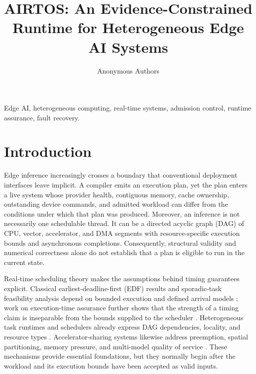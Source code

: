 \documentclass[lettersize,journal]{IEEEtran}
\begin{document}
\title{AIRTOS: An Evidence-Constrained Runtime for Heterogeneous Edge AI Systems}

\author{Anonymous Authors}

\maketitle

\begin{abstract}
\end{abstract}

\begin{IEEEkeywords}
Edge AI, heterogeneous computing, real-time systems, admission control, runtime assurance, fault recovery.
\end{IEEEkeywords}

\section{Introduction}
Edge inference increasingly crosses a boundary that conventional deployment
interfaces leave implicit. A compiler emits an execution plan, yet the plan
enters a live system whose provider health, contiguous memory, cache ownership,
outstanding device commands, and admitted workload can differ from the
conditions under which that plan was produced. Moreover, an inference is not
necessarily one schedulable thread. It can be a directed acyclic graph (DAG) of
CPU, vector, accelerator, and DMA segments with resource-specific execution
bounds and asynchronous completions. Consequently, structural validity and
numerical correctness alone do not establish that a plan is eligible to run in
the current state.

Real-time scheduling theory makes the assumptions behind timing guarantees
explicit. Classical earliest-deadline-first (EDF) results and sporadic-task
feasibility analysis depend on bounded execution and defined arrival models
\cite{liu1973scheduling,baruah1990preemptively}; work on execution-time
assurance further shows that the strength of a timing claim is inseparable from
the bounds supplied to the scheduler \cite{vestal2007preemptive}. Heterogeneous
task runtimes and schedulers already express DAG dependencies, locality, and
resource types \cite{topcuoglu2002performanceeffective,augonnet2011starpu,
bauer2012legion,rossbach2011ptask,lin2022typeaware}. Accelerator-sharing
systems likewise address preemption, spatial partitioning, memory pressure,
and multi-model quality of service
\cite{choi2020prema,ghodrati2020planaria,kim2023moca,kim2023dream}. These
mechanisms provide essential foundations, but they normally begin after the
workload and its execution bounds have been accepted as valid inputs.
\end{document}
